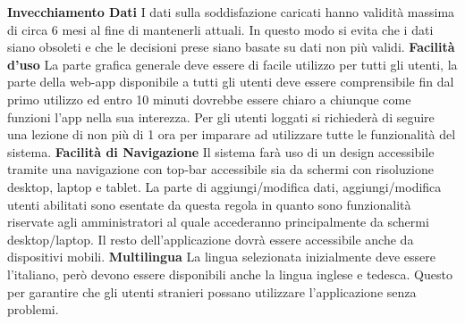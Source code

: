 \begin{rnfList}
        \rnfItem \textbf{Invecchiamento Dati} I dati sulla soddisfazione caricati hanno validità massima di circa 6 mesi al fine di mantenerli attuali. In questo modo si evita che i dati siano obsoleti e che le decisioni prese siano basate su dati non più validi.
        \rnfItem \textbf{Facilità d'uso} La parte grafica generale deve essere di facile utilizzo per tutti gli utenti, la parte della web-app disponibile a tutti gli utenti deve essere comprensibile fin dal primo utilizzo ed entro 10 minuti dovrebbe essere chiaro a chiunque come funzioni l'app nella sua interezza. Per gli utenti loggati si richiederà di seguire una lezione di non più di 1 ora per imparare ad utilizzare tutte le funzionalità del sistema.
        \rnfItem \textbf{Facilità di Navigazione} Il sistema farà uso di un design accessibile tramite una navigazione con top-bar accessibile sia da schermi con risoluzione desktop, laptop e tablet. La parte di aggiungi/modifica dati, aggiungi/modifica utenti abilitati sono esentate da questa regola in quanto sono funzionalità riservate agli amministratori al quale accederanno principalmente da schermi desktop/laptop. Il resto dell'applicazione dovrà essere accessibile anche da dispositivi mobili.
        \rnfItem \textbf{Multilingua} La lingua selezionata inizialmente deve essere l'italiano, però devono essere disponibili anche la lingua inglese e tedesca. Questo per garantire che gli utenti stranieri possano utilizzare l'applicazione senza problemi.
    \end{rnfList}